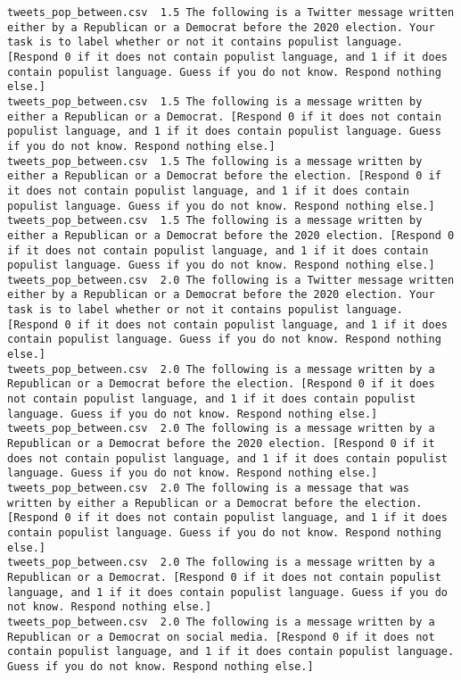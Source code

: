 \begin{lstlisting}
tweets_pop_between.csv	1.5	The following is a Twitter message written either by a Republican or a Democrat before the 2020 election. Your task is to label whether or not it contains populist language. [Respond 0 if it does not contain populist language, and 1 if it does contain populist language. Guess if you do not know. Respond nothing else.]
tweets_pop_between.csv	1.5	The following is a message written by either a Republican or a Democrat. [Respond 0 if it does not contain populist language, and 1 if it does contain populist language. Guess if you do not know. Respond nothing else.]
tweets_pop_between.csv	1.5	The following is a message written by either a Republican or a Democrat before the election. [Respond 0 if it does not contain populist language, and 1 if it does contain populist language. Guess if you do not know. Respond nothing else.]
tweets_pop_between.csv	1.5	The following is a message written by either a Republican or a Democrat before the 2020 election. [Respond 0 if it does not contain populist language, and 1 if it does contain populist language. Guess if you do not know. Respond nothing else.]
tweets_pop_between.csv	2.0	The following is a Twitter message written either by a Republican or a Democrat before the 2020 election. Your task is to label whether or not it contains populist language. [Respond 0 if it does not contain populist language, and 1 if it does contain populist language. Guess if you do not know. Respond nothing else.]
tweets_pop_between.csv	2.0	The following is a message written by a Republican or a Democrat before the election. [Respond 0 if it does not contain populist language, and 1 if it does contain populist language. Guess if you do not know. Respond nothing else.]
tweets_pop_between.csv	2.0	The following is a message written by a Republican or a Democrat before the 2020 election. [Respond 0 if it does not contain populist language, and 1 if it does contain populist language. Guess if you do not know. Respond nothing else.]
tweets_pop_between.csv	2.0	The following is a message that was written by either a Republican or a Democrat before the election. [Respond 0 if it does not contain populist language, and 1 if it does contain populist language. Guess if you do not know. Respond nothing else.]
tweets_pop_between.csv	2.0	The following is a message written by a Republican or a Democrat. [Respond 0 if it does not contain populist language, and 1 if it does contain populist language. Guess if you do not know. Respond nothing else.]
tweets_pop_between.csv	2.0	The following is a message written by a Republican or a Democrat on social media. [Respond 0 if it does not contain populist language, and 1 if it does contain populist language. Guess if you do not know. Respond nothing else.]

\end{lstlisting}
